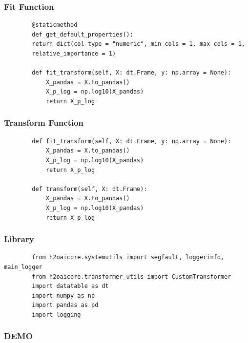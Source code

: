 \documentclass[11pt,
               aspectratio=169,
               hyperref={colorlinks}
               ]{beamer}
\begin{document}
	\begin{frame}[fragile]
		\frametitle{Fit Function}
		\begin{verbatim}
		@staticmethod
		def get_default_properties():
		return dict(col_type = "numeric", min_cols = 1, max_cols = 1,
		relative_importance = 1)

		def fit_transform(self, X: dt.Frame, y: np.array = None):
			X_pandas = X.to_pandas()
			X_p_log = np.log10(X_pandas)
			return X_p_log
		\end{verbatim}
\end{frame}
	\begin{frame}[fragile]
		\frametitle{Transform Function}
		\begin{verbatim}
		def fit_transform(self, X: dt.Frame, y: np.array = None):
			X_pandas = X.to_pandas()
			X_p_log = np.log10(X_pandas)
			return X_p_log

		def transform(self, X: dt.Frame):
			X_pandas = X.to_pandas()
			X_p_log = np.log10(X_pandas)
			return X_p_log
		\end{verbatim}
\end{frame}
	\begin{frame}[fragile]
		\frametitle{Library}
		\begin{verbatim}
		from h2oaicore.systemutils import segfault, loggerinfo, main_logger
		from h2oaicore.transformer_utils import CustomTransformer
		import datatable as dt
		import numpy as np
		import pandas as pd
		import logging
		\end{verbatim}
\end{frame}
	\begin{frame}
		\frametitle{DEMO}
	\end{frame}
\end{document}
